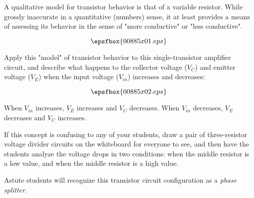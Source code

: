 

A qualitative model for transistor behavior is that of a variable resistor.  While grossly inaccurate in a quantitative (numbers) sense, it at least provides a means of assessing its behavior in the sense of "more conductive" or "less conductive".

$$\epsfbox{00885x01.eps}$$

Apply this "model" of transistor behavior to this single-transistor amplifier circuit, and describe what happens to the collector voltage ($V_C$) and emitter voltage ($V_E$) when the input voltage ($V_{in}$) increases and decreases:

$$\epsfbox{00885x02.eps}$$







When $V_{in}$ increases, $V_E$ increases and $V_C$ decreases.  When $V_{in}$ decreases, $V_E$ decreases and $V_C$ increases.







If this concept is confusing to any of your students, draw a pair of three-resistor voltage divider circuits on the whiteboard for everyone to see, and then have the students analyze the voltage drops in two conditions: when the middle resistor is a low value, and when the middle resistor is a high value.

Astute students will recognize this transistor circuit configuration as a {\it phase splitter}.




